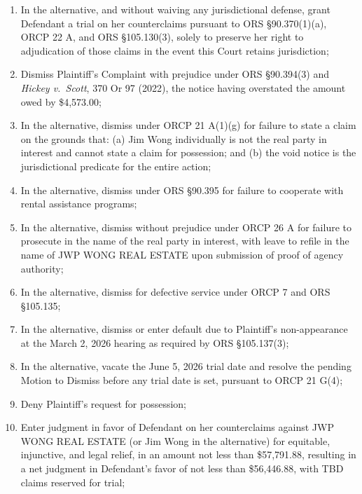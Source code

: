 \documentclass[12pt,letterpaper]{article}
\begin{document}
	\begin{enumerate}
		\item In the alternative, and without waiving any jurisdictional defense, grant Defendant a trial on her counterclaims pursuant to ORS \S90.370(1)(a), ORCP 22 A, and ORS \S105.130(3), solely to preserve her right to adjudication of those claims in the event this Court retains jurisdiction;
		
		\item Dismiss Plaintiff's Complaint with prejudice under ORS \S90.394(3) and \textit{Hickey v.\ Scott}, 370 Or 97 (2022), the notice having overstated the amount owed by \$4,573.00;
		
		\item In the alternative, dismiss under ORCP 21 A(1)(g) for failure to state a claim on the grounds that: (a) Jim Wong individually is not the real party in interest and cannot state a claim for possession; and (b) the void notice is the jurisdictional predicate for the entire action;
		
		\item In the alternative, dismiss under ORS \S90.395 for failure to cooperate with rental assistance programs;
		
		\item In the alternative, dismiss without prejudice under ORCP 26 A for failure to prosecute in the name of the real party in interest, with leave to refile in the name of JWP WONG REAL ESTATE upon submission of proof of agency authority;
		
		\item In the alternative, dismiss for defective service under ORCP 7 and ORS \S105.135;
		
		\item In the alternative, dismiss or enter default due to Plaintiff's non-appearance at the March 2, 2026 hearing as required by ORS \S105.137(3);
		
		\item In the alternative, vacate the June 5, 2026 trial date and resolve the pending Motion to Dismiss before any trial date is set, pursuant to ORCP 21 G(4);
		
		\item Deny Plaintiff's request for possession;
		
		\item Enter judgment in favor of Defendant on her counterclaims against JWP WONG REAL ESTATE (or Jim Wong in the alternative) for equitable, injunctive, and legal relief, in an amount not less than \$57,791.88, resulting in a net judgment in Defendant's favor of not less than \$56,446.88, with TBD claims reserved for trial;
		

\end{enumerate}
\end{document}
